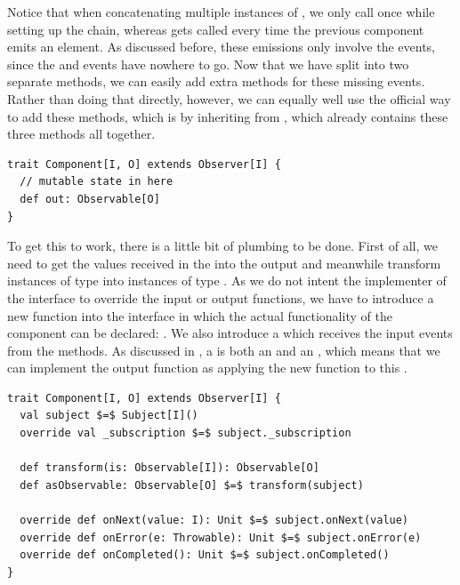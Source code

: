 Notice that when concatenating multiple instances of \comp, we only call  once while setting up the chain, whereas  gets called every time the previous component emits an element. As discussed before, these emissions only involve the  events, since the  and  events have nowhere to go. Now that we have split  into two separate methods, we can easily add extra methods for these missing events. Rather than doing that directly, however, we can equally well use the official way to add these methods, which is by inheriting \comp from \obv, which already contains these three methods all together.

\begin{lstlisting}[style=InlineScalaStyle]
trait Component[I, O] extends Observer[I] {
  // mutable state in here
  def out: Observable[O]
}
\end{lstlisting}

To get this to work, there is a little bit of plumbing to be done. First of all, we need to get the values received in the \obv into the output \obs and meanwhile transform instances of type  into instances of type . As we do not intent the implementer of the \comp interface to override the input or output functions, we have to introduce a new function into the interface in which the actual functionality of the component can be declared: . We also introduce a \subj which receives the input events from the \obv methods. As discussed in , a \subj is both an \obv and an \obs, which means that we can implement the output function as applying the new  function to this \subj.

\begin{minipage}{\linewidth}
\begin{lstlisting}[style=ScalaStyle, caption={\comp interface}, label={lst:component-v1}]
trait Component[I, O] extends Observer[I] {
  val subject $=$ Subject[I]()
  override val _subscription $=$ subject._subscription
  
  def transform(is: Observable[I]): Observable[O]
  def asObservable: Observable[O] $=$ transform(subject)
  
  override def onNext(value: I): Unit $=$ subject.onNext(value)
  override def onError(e: Throwable): Unit $=$ subject.onError(e)
  override def onCompleted(): Unit $=$ subject.onCompleted()
}
\end{lstlisting}
\end{minipage}


